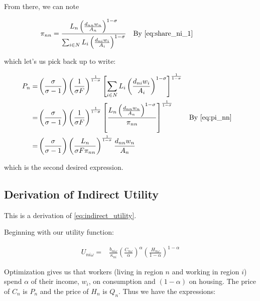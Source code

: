 \documentclass[10pt]{article}
\begin{document}
From there, we can note

\begin{align}
    \pi_{nn} &= \frac{L_n \left(\frac{d_{nn} w_n}{A_n}\right)^{1-\sigma}}{\sum_{i \in N} L_i \left(\frac{d_{ni} w_i}{A_i}\right)^{1-\sigma}} && \parbox[t]{4cm}{\raggedright By \eqref{eq:share_ni_1}} \label{eq:pi_nn}
\end{align}

which let's us pick back up to write:

\begin{align}
    P_n = &\left(\frac{\sigma}{\sigma-1}\right) \left(\frac{1}{\sigma F}\right)^{\frac{1}{1-\sigma}} \left[\sum_{i \in N} L_i \left(\frac{d_{ni} w_i}{A_i}\right)^{1-\sigma}\right]^{\frac{1}{1-\sigma}} \\
    = &\left(\frac{\sigma}{\sigma-1}\right) \left(\frac{1}{\sigma F}\right)^{\frac{1}{1-\sigma}} \left[\frac{L_n \left(\frac{d_{nn} w_n}{A_n}\right)^{1-\sigma}}{\pi_{nn}}\right]^{\frac{1}{1-\sigma}} && \text{By \eqref{eq:pi_nn}} \\
    = &\left(\frac{\sigma}{\sigma-1}\right) \left(\frac{L_n}{\sigma F \pi_{nn}}\right)^{\frac{1}{1-\sigma}} \frac{d_{nn} w_n}{A_n}
\end{align}

which is the second desired expression.


\subsection{Derivation of Indirect Utility}
\label{sec:indirect_utility}

This is a derivation of \eqref{eq:indirect_utility}.

Beginning with our utility function:

\begin{align}
    U_{n i \omega}=&\frac{b_{n i \omega}}{\kappa_{n i}}\left(\frac{C_{n \omega}}{\alpha}\right)^\alpha\left(\frac{H_{n \omega}}{1-\alpha}\right)^{1-\alpha}
\end{align}

Optimization gives us that workers (living in region $n$ and working in 
region $i$) spend $\alpha$
of their income, $w_i$, on consumption and $(1-\alpha)$ on housing.
The price of $C_n$ is $P_n$ and the price of $H_n$ is $Q_n$.
Thus we have the expressions:
\end{document}
